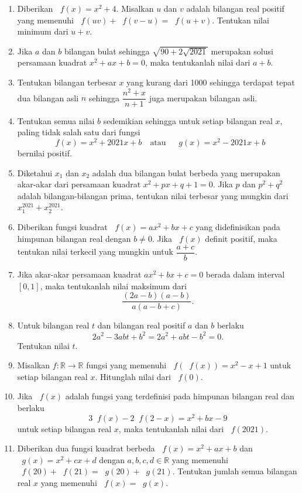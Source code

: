 \documentclass[12pt]{article}
\newcommand*\func[2]{\mathop{}\!{#1}{\left({#2}\right)}}
\begin{document}
\begin{enumerate}[leftmargin=*]
		\item Diberikan $ \func{f}{x} = x^{2} + 4 $. Misalkan $ u $ dan $ v $ adalah bilangan real positif yang memenuhi $ \func{f}{uv} + \func{f}{v - u} = \func{f}{u + v} $. Tentukan nilai minimum dari $ u + v $.
		\item Jika $ a $ dan $ b $ bilangan bulat sehingga $ \sqrt{90 + 2\sqrt{2021}} $ merupakan solusi persamaan kuadrat $ x^{2} + ax + b = 0 $, maka tentukanlah nilai dari $ a + b $.
		\item Tentukan bilangan terbesar $ x $ yang kurang dari 1000 sehingga terdapat tepat dua bilangan asli $ n $ sehingga $ \dfrac{n^{2} + x}{n + 1} $ juga merupakan bilangan asli.
		\item Tentukan semua nilai $ b $ sedemikian sehingga untuk setiap bilangan real $ x $, paling tidak salah satu dari fungsi
		\[ \func{f}{x} = x^{2} + 2021x + b \quad \mbox{atau} \quad \func{g}{x} = x^{2} - 2021x + b \]
		bernilai positif.
		\item Diketahui $ x_{1} $ dan $ x_{2} $ adalah dua bilangan bulat berbeda yang merupakan akar-akar dari persamaan kuadrat $ x^{2} + px + q + 1 = 0 $. Jika $ p $ dan $ p^{2} + q^{2} $ adalah bilangan-bilangan prima, tentukan nilai terbesar yang mungkin dari $ x_{1}^{2021} + x_{2}^{2021} $.
		\item Diberikan fungsi kuadrat $ \func{f}{x} = ax^{2} + bx + c $ yang didefinisikan pada himpunan bilangan real dengan $ b \ne 0 $. Jika $ \func{f}{x} $ definit positif, maka tentukan nilai terkecil yang mungkin untuk $ \dfrac{a + c}{b} $.
		\item Jika akar-akar persamaan kuadrat $ ax^{2} + bx + c = 0 $ berada dalam interval $ \left[0, 1\right] $, maka tentukanlah nilai maksimum dari
		\[ \frac{\left(2a - b\right)\left(a - b\right)}{a\left(a - b + c\right)}. \]
		\item Untuk bilangan real $ t $ dan bilangan real positif $ a $ dan $ b $ berlaku
		\[ 2a^{2} - 3abt + b^{2} = 2a^{2} + abt - b^{2} = 0. \]
		Tentukan nilai $ t $.
		\item Misalkan $ f : \mathbb{R} \to \mathbb{R} $ fungsi yang memenuhi $ \func{f}{\func{f}{x}} = x^{2} - x + 1 $ untuk setiap bilangan real $ x $. Hitunglah nilai dari $ \func{f}{0} $.
		\item Jika $ \func{f}{x} $ adalah fungsi yang terdefinisi pada himpunan bilangan real dan berlaku
		\[ 3\func{f}{x} - 2\func{f}{2 - x} = x^{2} + bx - 9 \]
		untuk setiap bilangan real $ x $, maka tentukanlah nilai dari $ \func{f}{2021} $.
		\item Diberikan dua fungsi kuadrat berbeda $ \func{f}{x} = x^{2} + ax + b $ dan $ \func{g}{x} = x^{2} + cx + d $ dengan $ a, b, c, d \in \mathbb{R} $ yang memenuhi $ \func{f}{20} + \func{f}{21} = \func{g}{20} + \func{g}{21} $. Tentukan jumlah semua bilangan real $ x $ yang memenuhi $ \func{f}{x} = \func{g}{x} $.

\end{enumerate}
\end{document}
